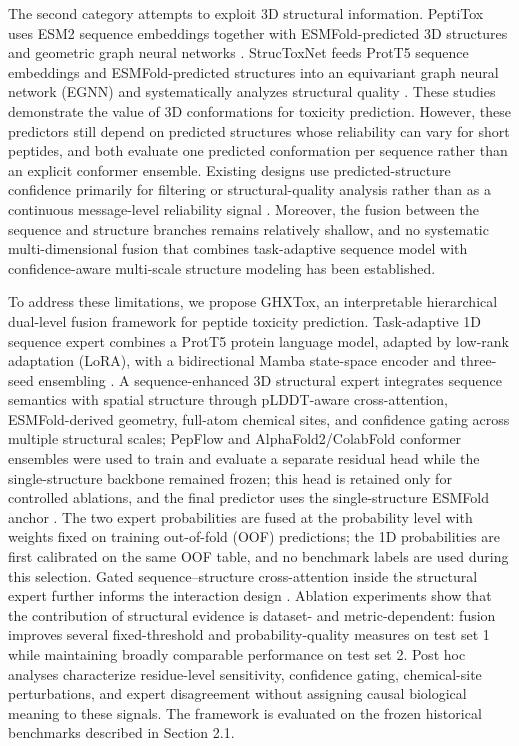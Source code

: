 \documentclass[12pt]{article}
\begin{document}
The second category attempts to exploit 3D structural information. PeptiTox
uses ESM2 sequence embeddings together with ESMFold-predicted 3D structures
and geometric graph neural networks \cite{wang2025peptitox}. StrucToxNet feeds ProtT5 sequence
embeddings and ESMFold-predicted structures into an equivariant graph neural
network (EGNN) and systematically analyzes structural quality \cite{jiao2025structoxnet}. These
studies demonstrate the value of 3D conformations for toxicity prediction.
However, these predictors still depend on predicted structures whose reliability
can vary for short peptides, and both evaluate one predicted conformation per
sequence rather than an explicit conformer ensemble. Existing designs use
predicted-structure confidence primarily for filtering or structural-quality
analysis rather than as a continuous message-level reliability signal
\cite{wang2025peptitox,jiao2025structoxnet,gulsevin2022benchmarking}.
Moreover, the fusion between the sequence and structure branches remains
relatively shallow, and no systematic multi-dimensional fusion that combines
task-adaptive sequence model with confidence-aware multi-scale structure
modeling has been established.

To address these limitations, we propose GHXTox, an interpretable hierarchical
dual-level fusion framework for peptide toxicity prediction. Task-adaptive
1D sequence expert combines a ProtT5 protein language model, adapted by
low-rank adaptation (LoRA), with a bidirectional Mamba state-space encoder
and three-seed ensembling \cite{elnaggar2022prottrans,hu2022lora,gu2024mamba}.
A sequence-enhanced 3D
structural expert integrates sequence semantics with spatial structure
through pLDDT-aware cross-attention, ESMFold-derived geometry, full-atom
chemical sites, and confidence gating across multiple structural scales;
PepFlow and AlphaFold2/ColabFold conformer ensembles were used to train and
evaluate a separate residual head while the single-structure backbone remained
frozen; this head is retained only for controlled ablations, and the final
predictor uses the single-structure ESMFold anchor
\cite{lin2023esmfold,jumper2021alphafold2,mirdita2022colabfold,abdin2024pepflow}.
The two expert probabilities are fused at the probability level with weights
fixed on training out-of-fold (OOF) predictions; the 1D probabilities are
first calibrated on the same OOF table, and no benchmark labels are used
during this selection. Gated sequence--structure
cross-attention inside the structural expert further informs the interaction
design \cite{zhang2026neuroppredpscg}. Ablation experiments show that the
contribution of structural evidence is dataset- and metric-dependent: fusion
improves several fixed-threshold and probability-quality measures on test set 1
while maintaining broadly comparable performance on test set 2. Post hoc analyses
characterize residue-level sensitivity, confidence gating, chemical-site
perturbations, and expert disagreement without assigning causal biological
meaning to these signals. The framework is evaluated on the frozen historical
benchmarks described in Section 2.1.
\end{document}
